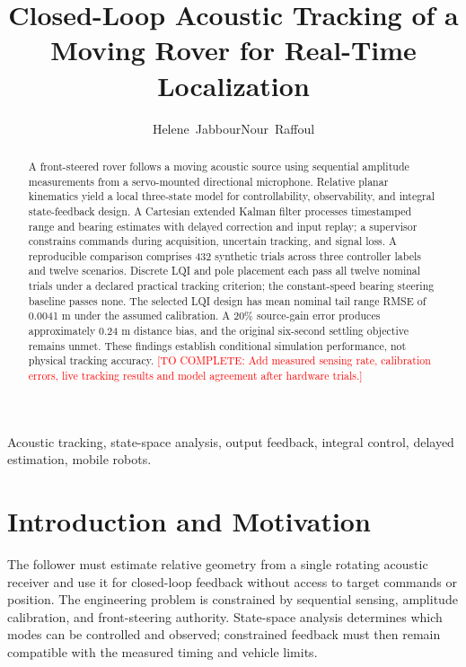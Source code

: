 \documentclass[journal,a4paper]{IEEEtran}
\begin{document}
\title{Closed-Loop Acoustic Tracking of a Moving Rover for Real-Time Localization}
\author{Helene~Jabbour\quad Nour~Raffoul}
\maketitle
\begin{abstract}
A front-steered rover follows a moving acoustic source using sequential amplitude measurements from a servo-mounted directional microphone. Relative planar kinematics yield a local three-state model for controllability, observability, and integral state-feedback design. A Cartesian extended Kalman filter processes timestamped range and bearing estimates with delayed correction and input replay; a supervisor constrains commands during acquisition, uncertain tracking, and signal loss. A reproducible comparison comprises 432 synthetic trials across three controller labels and twelve scenarios. Discrete LQI and pole placement each pass all twelve nominal trials under a declared practical tracking criterion; the constant-speed bearing steering baseline passes none. The selected LQI design has mean nominal tail range RMSE of 0.0041 m under the assumed calibration. A 20\% source-gain error produces approximately 0.24 m distance bias, and the original six-second settling objective remains unmet. These findings establish conditional simulation performance, not physical tracking accuracy.
\textcolor{red}{[TO COMPLETE: Add measured sensing rate, calibration errors, live tracking results and model agreement after hardware trials.]}
\end{abstract}
\begin{IEEEkeywords}
Acoustic tracking, state-space analysis, output feedback, integral control, delayed estimation, mobile robots.
\end{IEEEkeywords}

\section{Introduction and Motivation}


The follower must estimate relative geometry from a single rotating acoustic receiver and use it for closed-loop feedback without access to target commands or position. The engineering problem is constrained by sequential sensing, amplitude calibration, and front-steering authority. State-space analysis determines which modes can be controlled and observed; constrained feedback must then remain compatible with the measured timing and vehicle limits.
\end{document}
